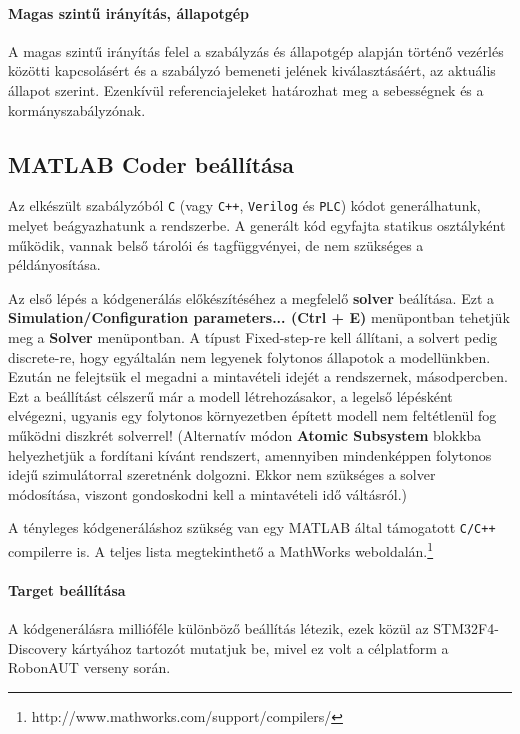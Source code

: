 \paragraph{Magas szintű irányítás, állapotgép}

A magas szintű irányítás felel a szabályzás és állapotgép alapján történő vezérlés közötti kapcsolásért és a szabályzó bemeneti jelének kiválasztásáért, az aktuális állapot szerint. Ezenkívül referenciajeleket határozhat meg a sebességnek és a kormányszabályzónak.

\subsection{MATLAB Coder beállítása}

Az elkészült szabályzóból \verb!C! (vagy \verb!C++!, \verb!Verilog! és \verb!PLC!) kódot generálhatunk, melyet beágyazhatunk a rendszerbe. A generált kód egyfajta statikus osztályként működik, vannak belső tárolói és tagfüggvényei, de nem szükséges a példányosítása.

Az első lépés a kódgenerálás előkészítéséhez a megfelelő \textbf{solver} beálítása. Ezt a \textbf{Simulation/Configuration parameters... (Ctrl + E)} menüpontban tehetjük meg a \textbf{Solver} menüpontban. A típust Fixed-step-re kell állítani, a solvert pedig discrete-re, hogy egyáltalán nem legyenek folytonos állapotok a modellünkben. Ezután ne felejtsük el megadni a mintavételi idejét a rendszernek, másodpercben.
Ezt a beállítást célszerű már a modell létrehozásakor, a legelső lépésként elvégezni, ugyanis egy folytonos környezetben épített modell nem feltétlenül fog működni diszkrét solverrel! (Alternatív módon \textbf{Atomic Subsystem} blokkba helyezhetjük a fordítani kívánt rendszert, amennyiben mindenképpen folytonos idejű szimulátorral szeretnénk dolgozni. Ekkor nem szükséges a solver módosítása, viszont gondoskodni kell a mintavételi idő váltásról.)

A tényleges kódgeneráláshoz szükség van egy MATLAB által támogatott \verb!C/C++! compilerre is. A teljes lista megtekinthető a MathWorks weboldalán.\footnote{http://www.mathworks.com/support/compilers/}

\paragraph{Target beállítása}

A kódgenerálásra millióféle különböző beállítás létezik, ezek közül az STM32F4-Discovery kártyához tartozót mutatjuk be, mivel ez volt a célplatform a RobonAUT verseny során.

